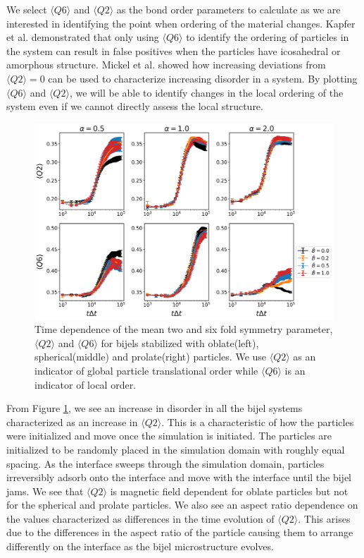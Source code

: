 We select $\langle Q6 \rangle$ and $\langle Q2 \rangle$ as the bond order parameters to calculate as we are interested in identifying the point when ordering 
of the material changes. Kapfer et al. demonstrated that only using $\langle Q6 \rangle$ to identify the ordering of particles in the system can result in 
false positives when the particles have icosahedral or amorphous structure. \cite{kapfer_jammed_2012} Mickel et al. showed how increasing deviations from 
$\langle Q2 \rangle = 0$ can be used to characterize increasing disorder in a system. \cite{mickel_shortcomings_2013} By plotting $\langle Q6 \rangle$ and 
$\langle Q2 \rangle$, we will be able to identify changes in the local ordering of the system even if we cannot directly assess the local structure.

\begin{figure} 
    \centering 
    \includegraphics[width=\columnwidth]{figures/results/paper1/steinhardt_vs_coverage.png} 
    \caption{Time dependence of the mean two and six fold symmetry parameter, $\langle Q2 \rangle$ and $\langle Q6 \rangle$ 
    for bijels stabilized with oblate(left), spherical(middle) and prolate(right) particles. We use $\langle Q2 \rangle$ as an
    indicator of global particle translational order while $\langle Q6 \rangle$ is an indicator of local order.} 
    \label{fig:steinhardt_coverage} 
\end{figure}

From Figure \ref{fig:steinhardt_coverage}, we see an increase in disorder in all the bijel systems characterized as an increase in $\langle Q2 \rangle$. 
This is a characteristic of how the particles were initialized and move once the simulation is initiated. The particles are initialized to be randomly placed 
in the simulation domain with roughly equal spacing. As the interface sweeps through the simulation domain, particles irreversibly adsorb onto the interface 
and move with the interface until the bijel jams. We see that $\langle Q2 \rangle$ is magnetic field dependent for oblate particles but not for the spherical 
and prolate particles. We also see an aspect ratio dependence on the values characterized as differences in the time evolution of $\langle Q2 \rangle$. This 
arises due to the differences in the aspect ratio of the particle causing them to arrange differently on the interface as the bijel microstructure evolves.

